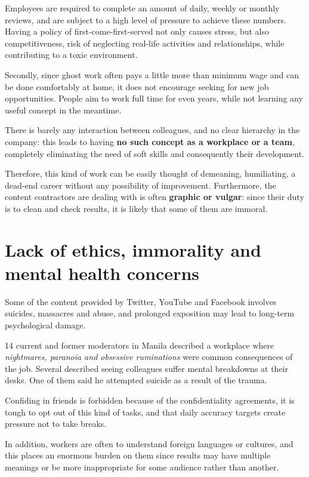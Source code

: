 \documentclass[12pt]{article}
\begin{document}
	Employees are required to complete an amount of daily, weekly or monthly reviews, and are subject to a high level of pressure to achieve these numbers. Having a policy of first-come-first-served not only causes stress, but also competitiveness, risk of neglecting real-life activities and relationships, while contributing to a toxic environment.
	
	Secondly, since ghost work often pays a little more than minimum wage and can be done comfortably at home, it does not encourage seeking for new job opportunities. People aim to work full time for even years, while not learning any useful concept in the meantime.
	
	There is barely any interaction between colleagues, and no clear hierarchy in the company: this leads to having \textbf{no such concept as a workplace or a team}, completely eliminating the need of soft skills and consequently their development. 
	
	Therefore, this kind of work can be easily thought of demeaning, humiliating, a dead-end career without any possibility of improvement. Furthermore, the content contractors are dealing with is often \textbf{graphic or vulgar}: since their duty is to clean and check results, it is likely that some of them are immoral. 
	
	\section{Lack of ethics, immorality and mental health concerns}
	Some of the content provided by Twitter, YouTube and Facebook involves suicides, massacres and abuse, and prolonged exposition may lead to long-term psychological damage. 
	
	14 current and former moderators in Manila described a workplace where \textit{nightmares, paranoia and obsessive ruminations} were common consequences of the job. Several described seeing colleagues suffer mental breakdowns at their desks. One of them said he attempted suicide as a result of the trauma.
	
	Confiding in friends is forbidden because of the confidentiality agreements, it is tough to opt out of this kind of tasks, and that daily accuracy targets create pressure not to take breaks\cite{washington}.
	
	In addition, workers are often to understand foreign languages or cultures, and this places an enormous burden on them since results may have multiple meanings or be more inappropriate for some audience rather than another.
	
\end{document}
